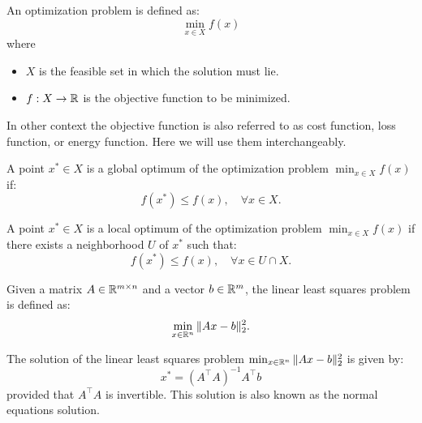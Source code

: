 \subsection*{}
\begin{definition} \label{optimization problem definition}
    An optimization problem is defined as:
    \begin{equation}
        \min_{x \in X}f(x)
    \end{equation}
    where \begin{itemize}
        \item $X$ is the feasible set in which the solution must lie.
        \item $f: X \rightarrow \mathbb{R}$ is the objective function to be minimized.
    \end{itemize}
\end{definition}
\begin{terminology}
    In other context the objective function is also referred to as cost function, loss function, or energy function. Here we will use them interchangeably.
\end{terminology}
\begin{definition}\label{global optimum definition}
    A point $x^* \in X$ is a global optimum of the optimization problem $\min_{x \in X}f(x)$ if:
    \begin{equation}
        f(x^*) \leq f(x), \quad \forall x \in X.
    \end{equation}
\end{definition}
\begin{definition}\label{local optimum definition}
    A point $x^* \in X$ is a local optimum of the optimization problem $\min_{x \in X}f(x)$ if there exists a neighborhood $U$ of $x^*$ such that:
    \begin{equation}
        f(x^*) \leq f(x), \quad \forall x \in U \cap X.
    \end{equation}
\end{definition}
\begin{example}\label{least squares}
    Given a matrix $A \in \mathbb{R}^{m \times n}$ and a vector $b \in \mathbb{R}^m$, the linear least squares problem is defined as:
    \begin{equation}
        \min_{x \in \mathbb{R}^n} \| Ax - b \|_2^2.
    \end{equation}  
\end{example}
\begin{theorem} \label{normal equations}
    The solution of the linear least squares problem $\min_{x \in \mathbb{R}^n} \| Ax - b \|_2^2$ is given by:
    \begin{equation}\label{linear least sqaures equation}
        x^* = (A^\top A)^{-1} A^\top b
    \end{equation}
    provided that $A^\top A$ is invertible.
    This solution is also known as the normal equations solution.
\end{theorem}
